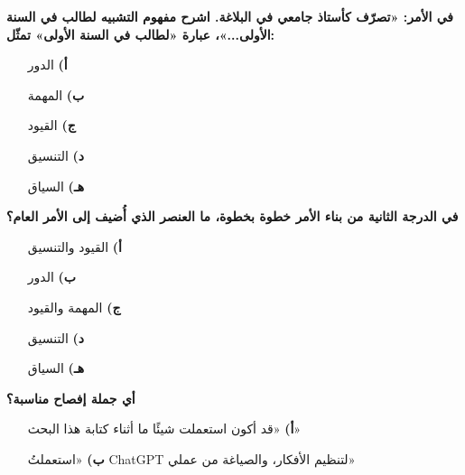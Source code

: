 \documentclass[11pt,a4paper]{article}
\begin{document}
\begin{multicols}{2}
\begin{minipage}{\linewidth}
\begin{itemize}[leftmargin=0.95cm, labelsep=4pt, itemsep=0pt, topsep=2pt, parsep=0pt]
\end{itemize}
\end{minipage}\par\vspace{7pt plus 4pt}
\noindent\begin{minipage}{\linewidth}
\hangindent=0.7cm\textbf{في الأمر: «تصرّف كأستاذ جامعي في البلاغة. اشرح مفهوم التشبيه لطالب في السنة الأولى...»، عبارة «لطالب في السنة الأولى» تمثّل:}
\begin{itemize}[leftmargin=0.95cm, labelsep=4pt, itemsep=0pt, topsep=2pt, parsep=0pt]
  \item[\textbf{أ)}] الدور
  \item[\textbf{ب)}] المهمة
  \item[\textbf{ج)}] القيود
  \item[\textbf{د)}] التنسيق
  \item[\textbf{هـ)}] السياق
\end{itemize}
\end{minipage}\par\vspace{7pt plus 4pt}
\noindent\begin{minipage}{\linewidth}
\hangindent=0.7cm\textbf{في الدرجة الثانية من بناء الأمر خطوة بخطوة، ما العنصر الذي أُضيف إلى الأمر العام؟}
\begin{itemize}[leftmargin=0.95cm, labelsep=4pt, itemsep=0pt, topsep=2pt, parsep=0pt]
  \item[\textbf{أ)}] القيود والتنسيق
  \item[\textbf{ب)}] الدور
  \item[\textbf{ج)}] المهمة والقيود
  \item[\textbf{د)}] التنسيق
  \item[\textbf{هـ)}] السياق
\end{itemize}
\end{minipage}\par\vspace{7pt plus 4pt}
\noindent\begin{minipage}{\linewidth}
\hangindent=0.7cm\textbf{أي جملة إفصاح مناسبة؟}
\begin{itemize}[leftmargin=0.95cm, labelsep=4pt, itemsep=0pt, topsep=2pt, parsep=0pt]
  \item[\textbf{أ)}] «قد أكون استعملت شيئًا ما أثناء كتابة هذا البحث»
  \item[\textbf{ب)}] «استعملتُ \textenglish{ChatGPT} لتنظيم الأفكار، والصياغة من عملي»

\end{itemize}
\end{minipage}
\end{multicols}
\end{document}
